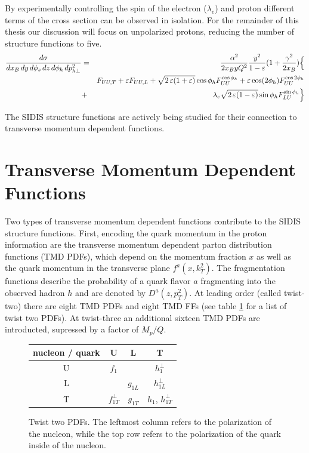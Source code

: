 By experimentally controlling the spin of the electron ($\lambda_e$) and proton different terms of the cross section can be observed in isolation.  For the remainder of this thesis our discussion will focus on unpolarized protons, reducing the number of structure functions to five.  
\begin{eqnarray}
\frac{d\sigma}{dx_B \, dy\, d\phi_s \,dz\, d\phi_h\, d p_{h\perp}^2}
&=&\frac{\alpha^2}{2x_B y Q^2}
\frac{y^2}{1-\varepsilon}  ( 1+\frac{\gamma^2}{2x_B} ) \Bigl\{  \nonumber \\
&& F_{UU ,T} +  \varepsilon F_{UU ,L}
+ \sqrt{2\,\varepsilon (1+\varepsilon)} \cos\phi_h F_{UU}^{\cos\phi_h}
+ \varepsilon \cos(2\phi_h) F_{UU}^{\cos 2\phi_h} \nonumber \\
&+& \lambda_e
\sqrt{2\,\varepsilon (1-\varepsilon)} \sin\phi_h F_{LU}^{\sin\phi_h}\Bigr\}
\end{eqnarray}

The SIDIS structure functions are actively being studied for their connection to transverse momentum dependent functions.

\section{Transverse Momentum Dependent Functions}
Two types of transverse momentum dependent functions contribute to the SIDIS structure functions.  First, encoding the quark momentum in the proton information are the transverse momentum dependent parton distribution functions (TMD PDFs), which depend on the momentum fraction $x$ as well as the quark momentum in the transverse plane $f^{a}(x, k_{T}^{2})$.  The fragmentation functions describe the probability of a quark flavor $a$ fragmenting into the observed hadron $h$ and are denoted by $D^{a}(z, p_{T}^{2})$.  At leading order (called twist-two) there are eight TMD PDFs and eight TMD FFs (see table \ref{table:twist-two-pdfs} for a list of twist two PDFs).  At twist-three an additional sixteen TMD PDFs are introducted, supressed by a factor of $M_p/Q$.

\begin{figure}
	\centering
	\begin{tabular}{|c|c|c|c|}
		\hline 
		nucleon / quark & U & L & T \\
		\hline
		U & $f_1$ & & $h_1^{\perp}$ \\
		L & & $g_{1L}$ & $h_{1L}^{\perp}$ \\
		T & $f_{1T}^{\perp}$ & $g_{1T}$ & $h_1$, $h_{1T}^{\perp}$ \\ 
		\hline
	\end{tabular}
	\caption[Twist two PDFs]{Twist two PDFs.  The leftmost column refers to the polarization of the nucleon, while the top row refers to the polarization of the quark inside of the nucleon.}
	\label{table:twist-two-pdfs}
\end{figure}

